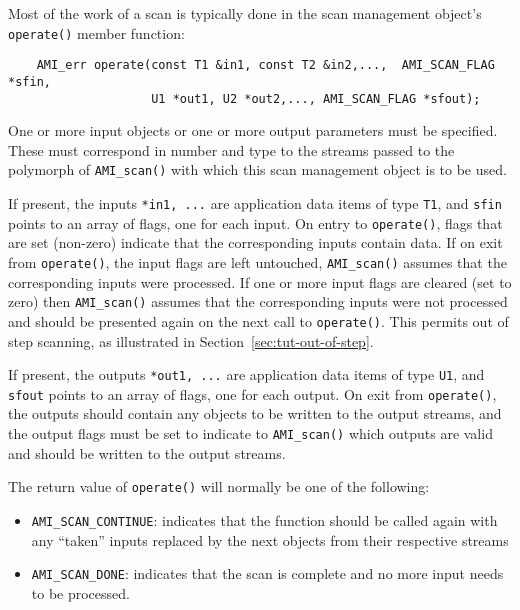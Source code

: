     Most of the work of a scan is typically done in the scan
    management object's \lstinline|operate()| member function:
\begin{lstlisting}
    AMI_err operate(const T1 &in1, const T2 &in2,...,  AMI_SCAN_FLAG *sfin,
                    U1 *out1, U2 *out2,..., AMI_SCAN_FLAG *sfout);
\end{lstlisting}
    
    One or more input objects or one or more output
    parameters must be specified.  These must correspond in
    number and type to the streams passed to the polymorph
    of \lstinline|AMI_scan()| with which this scan management
    object is to be used.
    
    If present, the inputs \lstinline|*in1, ...| are application
    data items of type \lstinline|T1|, and \lstinline|sfin| points
    to an array of flags, one for each input.  On entry to
    \lstinline|operate()|, flags that are set (non-zero)
    indicate that the corresponding inputs contain data.  If
    on exit from \lstinline|operate()|, the input flags are
    left untouched, \lstinline|AMI_scan()| assumes that the
    corresponding inputs were processed.  If one or more
    input flags are cleared (set to zero) then
    \lstinline|AMI_scan()| assumes that the corresponding
    inputs were not processed and should be presented again
    on the next call to \lstinline|operate()|.  This permits
    out of step scanning, as
    illustrated in Section~\ref{sec:tut-out-of-step}.
    
    If present, the outputs \lstinline|*out1, ...| are
    application data items of type \lstinline|U1|, and
    \lstinline|sfout| points to an array of flags, one for each
    output. On exit from \lstinline|operate()|, the outputs
    should contain any objects to be written to the output
    streams, and the output flags must be set to indicate to
    \lstinline|AMI_scan()| which outputs are valid and should
    be written to the output streams.
    
    The return value of \lstinline|operate()| will normally be
    one of the following:
    \begin{itemize}
        \item \lstinline|AMI_SCAN_CONTINUE|:
         indicates that
        the function should be called again with any
        ``taken'' inputs replaced by the next objects from
        their respective streams
        \item \lstinline|AMI_SCAN_DONE|: 
        indicates that the
        scan is complete and no more input needs to be
        processed.
    \end{itemize}
    

